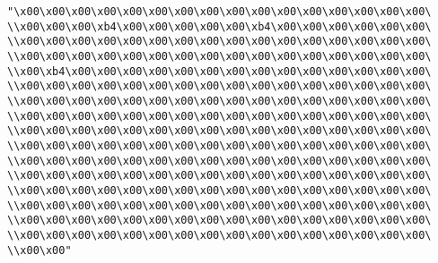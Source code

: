 \verb|"\x00\x00\x00\x00\x00\x00\x00\x00\x00\x00\x00\x00\x00\x00\x00\x00\|\newline
\verb|\\x00\x00\x00\xb4\x00\x00\x00\x00\x00\xb4\x00\x00\x00\x00\x00\x00\|\newline
\verb|\\x00\x00\x00\x00\x00\x00\x00\x00\x00\x00\x00\x00\x00\x00\x00\x00\|\newline
\verb|\\x00\x00\x00\x00\x00\x00\x00\x00\x00\x00\x00\x00\x00\x00\x00\x00\|\newline
\verb|\\x00\xb4\x00\x00\x00\x00\x00\x00\x00\x00\x00\x00\x00\x00\x00\x00\|\newline
\verb|\\x00\x00\x00\x00\x00\x00\x00\x00\x00\x00\x00\x00\x00\x00\x00\x00\|\newline
\verb|\\x00\x00\x00\x00\x00\x00\x00\x00\x00\x00\x00\x00\x00\x00\x00\x00\|\newline
\verb|\\x00\x00\x00\x00\x00\x00\x00\x00\x00\x00\x00\x00\x00\x00\x00\x00\|\newline
\verb|\\x00\x00\x00\x00\x00\x00\x00\x00\x00\x00\x00\x00\x00\x00\x00\x00\|\newline
\verb|\\x00\x00\x00\x00\x00\x00\x00\x00\x00\x00\x00\x00\x00\x00\x00\x00\|\newline
\verb|\\x00\x00\x00\x00\x00\x00\x00\x00\x00\x00\x00\x00\x00\x00\x00\x00\|\newline
\verb|\\x00\x00\x00\x00\x00\x00\x00\x00\x00\x00\x00\x00\x00\x00\x00\x00\|\newline
\verb|\\x00\x00\x00\x00\x00\x00\x00\x00\x00\x00\x00\x00\x00\x00\x00\x00\|\newline
\verb|\\x00\x00\x00\x00\x00\x00\x00\x00\x00\x00\x00\x00\x00\x00\x00\x00\|\newline
\verb|\\x00\x00\x00\x00\x00\x00\x00\x00\x00\x00\x00\x00\x00\x00\x00\x00\|\newline
\verb|\\x00\x00\x00\x00\x00\x00\x00\x00\x00\x00\x00\x00\x00\x00\x00\x00\|\newline
\verb|\\x00\x00"|\newline
